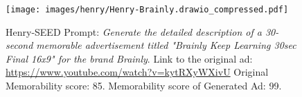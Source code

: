 \begin{figure}[]
    \centering
    \texttt{[image: images/henry/Henry-Brainly.drawio\_compressed.pdf]}
    \caption{Henry-SEED Prompt: \textit{Generate the detailed description of a 30-second memorable advertisement titled "Brainly Keep Learning 30sec Final 16x9" for the brand Brainly}. Link to the original ad: \url{https://www.youtube.com/watch?v=kytRXyWXivU} Original Memorability score: 85. Memorability score of Generated Ad: 99.}
    \label{fig:brainly-generated-ad}

\end{figure}






